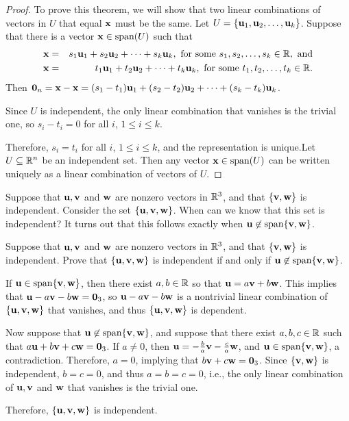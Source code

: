 \begin{proof}
To prove this theorem, we will show that two linear combinations of vectors in $U$ that equal ${\bf x}$ must be the same. Let $U =\{{\bf u}_1, {\bf u}_2, \ldots, {\bf u}_k\}$.
Suppose that there is a vector ${\bf x}\in \mbox{span}(U)$ such that
\begin{eqnarray*}
{\bf x} & = & s_1{\bf u}_1 + s_2{\bf u}_2 + \cdots + s_k{\bf u}_k,
\mbox{ for some } s_1, s_2, \ldots, s_k\in\mathbb{R}, \mbox{ and} \\
{\bf x} & = & t_1{\bf u}_1 + t_2{\bf u}_2 + \cdots + t_k{\bf u}_k,
\mbox{ for some } t_1, t_2, \ldots, t_k\in\mathbb{R}.
\end{eqnarray*}
Then 
${\bf 0}_n={\bf x}-{\bf x} = (s_1-t_1){\bf u}_1 + (s_2-t_2){\bf u}_2 + \cdots +
(s_k-t_k){\bf u}_k$.

Since $U$ is independent, the only linear combination that vanishes
is the trivial one, so $s_i-t_i=0$ for all $i$, $1\leq i\leq k$.

Therefore, $s_i=t_i$ for all $i$, $1\leq i\leq k$, and the
representation is unique.Let $U \subseteq\mathbb{R}^n$ be an independent set.
Then any vector ${\bf x}\in\mbox{span}(U)$ can be written uniquely as a linear combination of vectors of $U$.
\end{proof}

Suppose that ${\bf u},{\bf v}$ and ${\bf w}$ are nonzero vectors in $\mathbb{R}^3$,
and that $\{{\bf v},{\bf w}\}$ is independent. Consider the set $\{{\bf u},{\bf v},{\bf w}\}$. When can we know that this set is independent? It turns out that this follows exactly when ${\bf u}\not\in\mbox{span}\{{\bf v},{\bf w}\}$.

\begin{example}{}{}
Suppose that ${\bf u},{\bf v}$ and ${\bf w}$ are nonzero vectors in $\mathbb{R}^3$,
and that $\{{\bf v},{\bf w}\}$ is independent.
Prove that $\{{\bf u},{\bf v},{\bf w}\}$ is independent if and only if 
${\bf u}\not\in\mbox{span}\{{\bf v},{\bf w}\}$.
\end{example}

\begin{solution}
If ${\bf u}\in\mbox{span}\{{\bf v},{\bf w}\}$, then there exist $a,b\in\mathbb{R}$ so
that ${\bf u}=a{\bf v} + b{\bf w}$.
This implies that ${\bf u}-a{\bf v} - b{\bf w}={\bf 0}_3$,
so  ${\bf u}-a{\bf v} - b{\bf w}$
is a nontrivial linear combination of $\{{\bf u},{\bf v},{\bf w}\}$ that
vanishes, 
and thus $\{{\bf u},{\bf v},{\bf w}\}$ is dependent.

Now suppose that ${\bf u}\not\in\mbox{span}\{{\bf v},{\bf w}\}$, and suppose
that there exist $a,b,c\in\mathbb{R}$ such that
$a{\bf u}+b{\bf v}+c{\bf w}={\bf 0}_3$.
If $a\neq 0$, then ${\bf u}=-\frac{b}{a}{\bf v}-\frac{c}{a}{\bf w}$,
and ${\bf u}\in\mbox{span}\{{\bf v},{\bf w}\}$, a contradiction.
Therefore, $a=0$, implying that $b{\bf v}+c{\bf w}={\bf 0}_3$.
Since $\{{\bf v},{\bf w}\}$ is independent, $b=c=0$, and thus
$a=b=c=0$, i.e., the only linear combination of 
${\bf u},{\bf v}$ and ${\bf w}$ that vanishes is the trivial one.

Therefore, $\{{\bf u},{\bf v},{\bf w}\}$ is independent.
\end{solution}

